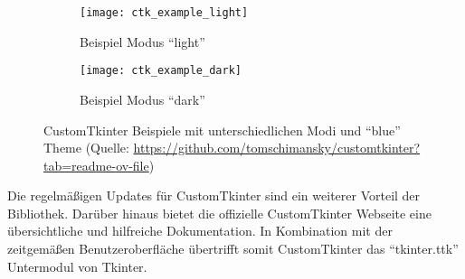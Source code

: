 \begin{figure}[H]
	\begin{subfigure}[t]{0.90\textwidth}
		\centering
		\texttt{[image: ctk\_example\_light]}
		\caption{Beispiel Modus \enquote{light} \label{fig:ctk_light}}
	\end{subfigure}
	\begin{subfigure}[t]{0.90\textwidth}
		\centering
		\texttt{[image: ctk\_example\_dark]}
		\caption{Beispiel Modus \enquote{dark} \label{fig:ctk_dark}}
	\end{subfigure}
	\caption{CustomTkinter Beispiele mit unterschiedlichen Modi und \enquote{blue} Theme  (Quelle: \url{https://github.com/tomschimansky/customtkinter?tab=readme-ov-file})    \label{fig:ctk_bsp}}
\end{figure}

Die regelmäßigen Updates für CustomTkinter sind ein weiterer Vorteil der Bibliothek. Darüber hinaus bietet die offizielle CustomTkinter Webseite eine übersichtliche und hilfreiche Dokumentation. In Kombination mit der zeitgemäßen Benutzeroberfläche übertrifft somit CustomTkinter das \enquote{tkinter.ttk} Untermodul von Tkinter.



